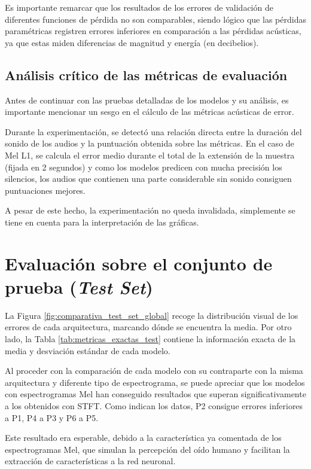 Es importante remarcar que los resultados de los errores de validación de diferentes funciones de pérdida no son comparables, siendo lógico que las pérdidas paramétricas registren errores inferiores en comparación a las pérdidas acústicas, ya que estas miden diferencias de magnitud y energía (en decibelios).


\subsection{Análisis crítico de las métricas de evaluación}
\label{sec:AnalisisCriticoMetricas}
Antes de continuar con las pruebas detalladas de los modelos y su análisis, es importante mencionar un sesgo en el cálculo de las métricas acústicas de error.

Durante la experimentación, se detectó una relación directa entre la duración del sonido de los audios y la puntuación obtenida sobre las métricas. En el caso de Mel L1, se calcula el error medio durante el total de la extensión de la muestra (fijada en 2 segundos) y como los modelos predicen con mucha precisión los silencios, los audios que contienen una parte considerable sin sonido consiguen puntuaciones mejores.

A pesar de este hecho, la experimentación no queda invalidada, simplemente se tiene en cuenta para la interpretación de las gráficas.

\section{Evaluación sobre el conjunto de prueba (\textit{Test Set})}

La Figura \ref{fig:comparativa_test_set_global} recoge la distribución visual de los errores de cada arquitectura, marcando dónde se encuentra la media. Por otro lado, la Tabla \ref{tab:metricas_exactas_test} contiene la información exacta de la media y desviación estándar de cada modelo.

Al proceder con la comparación de cada modelo con su contraparte con la misma arquitectura y diferente tipo de espectrograma, se puede apreciar que los modelos con espectrogramas Mel han conseguido resultados que superan significativamente a los obtenidos con STFT. Como indican los datos, P2 consigue errores inferiores a P1, P4 a P3 y P6 a P5. 

Este resultado era esperable, debido a la característica ya comentada de los espectrogramas Mel, que simulan la percepción del oído humano y facilitan la extracción de características a la red neuronal. 

